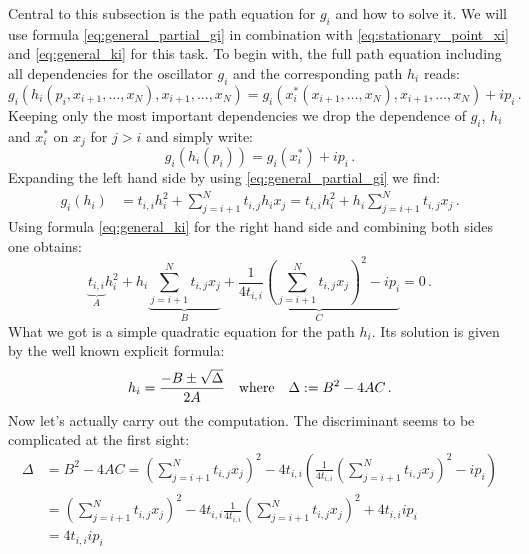 \documentclass[a4paper,10pt]{article}
\begin{document}
Central to this subsection is the path equation for $g_i$ and how to
solve it. We will use formula \eqref{eq:general_partial_gi} in combination
with \eqref{eq:stationary_point_xi} and \eqref{eq:general_ki} for this task.
To begin with, the full path equation including all dependencies for the
oscillator $g_i$ and the corresponding path $h_i$ reads:
\begin{equation*}
  g_i\left(h_i\left(p_i, x_{i+1}, \ldots, x_N\right), x_{i+1}, \ldots, x_N\right)
  = g_i\left(x_i^{*}\left(x_{i+1}, \ldots, x_N\right), x_{i+1}, \ldots, x_N\right) + i p_i \,.
\end{equation*}
Keeping only the most important dependencies we drop the dependence
of $g_i$, $h_i$ and $x_i^{*}$ on $x_j$ for $j>i$ and simply write:
\begin{equation} \label{eq:general_path_eqn}
  g_i\left(h_i\left(p_i\right)\right) = g_i\left(x_i^*\right) + i p_i \,.
\end{equation}
Expanding the left hand side by using \eqref{eq:general_partial_gi} we find:
\begin{equation}
\begin{split}
  g_i\left(h_i\right)
  & = t_{i,i} h_i^2 + \sum_{j=i+1}^{N} t_{i,j} h_i x_j
    = t_{i,i} h_i^2 +  h_i \sum_{j=i+1}^{N} t_{i,j} x_j \,.
\end{split}
\end{equation}
Using formula \eqref{eq:general_ki} for the right hand side and
combining both sides one obtains:
\begin{equation}
  \underbrace{t_{i,i}}_{A} h_i^2
  +
  h_i \underbrace{\sum_{j=i+1}^{N} t_{i,j} x_j}_{B}
  +
  \underbrace{\frac{1}{4 t_{i,i}} \left( \sum_{j=i+1}^{N} t_{i,j} x_j \right)^2 - i p_i}_{C}
  = 0 \,.
\end{equation}
What we got is a simple quadratic equation for the path $h_i$.
Its solution is given by the well known explicit formula:
\begin{equation}
  h_i = \frac{-B \pm \sqrt{\Delta}}{2 A}
  \quad \text{where} \quad
  \Delta := B^2 - 4 A C \,.
\end{equation}
Now let's actually carry out the computation.
The discriminant seems to be complicated at the first sight:
\begin{equation}
\begin{split}
  \Delta & = B^2 - 4 A C
  = \left(\sum_{j=i+1}^{N} t_{i,j} x_j\right)^2
    - 4 t_{i,i} \left(\frac{1}{4 t_{i,i}} \left( \sum_{j=i+1}^{N} t_{i,j} x_j \right)^2 - i p_i\right) \\
  & = \left(\sum_{j=i+1}^{N} t_{i,j} x_j\right)^2
      - 4 t_{i,i} \frac{1}{4 t_{i,i}} \left( \sum_{j=i+1}^{N} t_{i,j} x_j \right)^2
      + 4 t_{i,i} i p_i \\
  & = 4 t_{i,i} i p_i
\end{split}
\end{equation}
\end{document}
